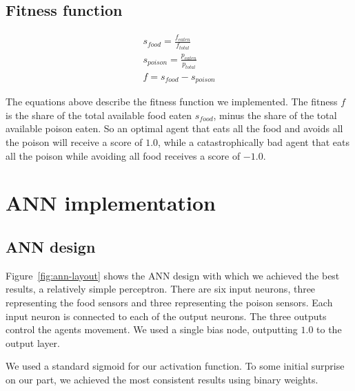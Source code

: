 \documentclass[twoside]{article}
\begin{document}
\begin{multicols}{2}
  \subsection{Fitness function}

  \begin{gather*}
    s_{food} = \frac{f_{eaten}}{f_{total}} \\[10pt]
    s_{poison} = \frac{p_{eaten}}{p_{total}} \\[10pt]
    f = s_{food} - s_{poison}
  \end{gather*}

  The equations above describe the fitness function we implemented.
  The fitness $f$ is the share of the total available food eaten $s_{food}$, minus the share of the total available poison eaten.
  So an optimal agent that eats all the food and avoids all the poison will receive a score of $1.0$, while a catastrophically bad agent that eats all the poison while avoiding all food receives a score of $-1.0$.

  \section{ANN implementation}

  \subsection{ANN design}

  \def\layersep{2.0cm}

  Figure~\ref{fig:ann-layout} shows the ANN design with which we achieved the best results,
  a relatively simple perceptron.
  There are six input neurons, three representing the food sensors and three representing the poison sensors.
  Each input neuron is connected to each of the output neurons.
  The three outputs control the agents movement.
  We used a single bias node, outputting $1.0$ to the output layer.

  We used a standard sigmoid for our activation function.
  To some initial surprise on our part, we achieved the most consistent results using binary weights.
  
  \begin{figure}[H]
    \centering
\end{figure}
\end{multicols}
\end{document}
